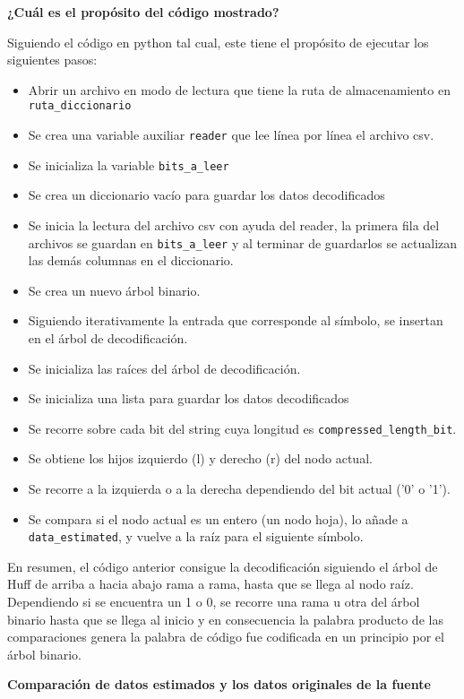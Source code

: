 \documentclass[conference,onecolumn,12pt]{IEEEtran}
\numberwithin{equation}{subsection}
\begin{document}
\textbf{¿Cuál es el propósito del código mostrado?}

Siguiendo el código en python tal cual, este tiene el propósito de ejecutar los siguientes pasos:

\begin{itemize}
\item Abrir un archivo en modo de lectura que tiene la ruta de almacenamiento en \texttt{ruta_diccionario}
\item Se crea una variable auxiliar \texttt{reader} que lee línea por línea el archivo csv.
\item Se inicializa la variable \texttt{bits_a_leer}
\item Se crea un diccionario vacío para guardar los datos decodificados
\item Se inicia la lectura del archivo csv con ayuda del reader, la primera fila del archivos se guardan en \texttt{bits_a_leer} y al terminar de guardarlos se actualizan las demás columnas en el diccionario.
\item Se crea un nuevo árbol binario.
\item Siguiendo iterativamente la entrada que corresponde al símbolo, se insertan en el árbol de decodificación.
\item Se inicializa las raíces del árbol de decodificación.
 \item Se inicializa una lista para guardar los datos decodificados
\item Se recorre sobre cada bit del string cuya longitud es \texttt{compressed_length_bit}.
\item Se obtiene los hijos izquierdo (l) y derecho (r) del nodo actual.
\item Se recorre a la izquierda o a la derecha dependiendo del bit actual ('0' o '1').
\item Se compara si el nodo actual es un entero (un nodo hoja), lo añade a \texttt{data_estimated}, y vuelve a la raíz para el siguiente símbolo.
\end{itemize}


En resumen, el código anterior consigue la decodificación siguiendo el árbol de Huff de arriba a hacia abajo rama a rama, hasta que se llega al nodo raíz. Dependiendo si se encuentra un 1 o 0, se recorre una rama u otra del árbol binario hasta que se llega al inicio y en consecuencia la palabra producto de las comparaciones genera la palabra de código fue codificada en un principio por el árbol binario.


\textbf{Comparación de datos estimados y los datos originales de la fuente}
\end{document}
